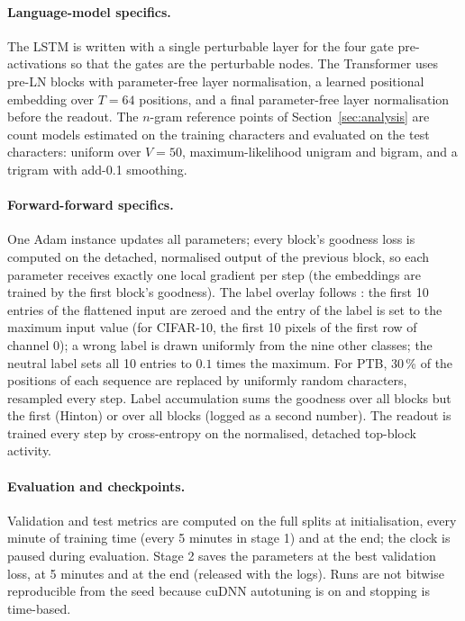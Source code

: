 \documentclass{article}
\begin{document}
\paragraph{Language-model specifics.}
The LSTM is written with a single perturbable layer for the four gate pre-activations
so that the gates are the perturbable nodes. The Transformer uses pre-LN blocks with
parameter-free layer normalisation, a learned positional embedding over $T=64$
positions, and a final parameter-free layer normalisation before the readout. The
$n$-gram reference points of Section~\ref{sec:analysis} are count models estimated on
the training characters and evaluated on the test characters: uniform over $V=50$,
maximum-likelihood unigram and bigram, and a trigram with add-0.1 smoothing.

\paragraph{Forward-forward specifics.}
One Adam instance updates all parameters; every block's goodness loss is computed on
the detached, normalised output of the previous block, so each parameter receives
exactly one local gradient per step (the embeddings are trained by the first block's
goodness). The label overlay follows \citet{pezeshki2023ff}: the first 10 entries of
the flattened input are zeroed and the entry of the label is set to the maximum input
value (for CIFAR-10, the first 10 pixels of the first row of channel 0); a wrong label
is drawn uniformly from the nine other classes; the neutral label sets all 10 entries
to $0.1$ times the maximum. For PTB, 30\,\% of the positions of each sequence are
replaced by uniformly random characters, resampled every step. Label accumulation sums
the goodness over all blocks but the first (Hinton) or over all blocks (logged as a
second number). The readout is trained every step by cross-entropy on the normalised,
detached top-block activity.

\paragraph{Evaluation and checkpoints.}
Validation and test metrics are computed on the full splits at initialisation, every
minute of training time (every 5 minutes in stage 1) and at the end; the clock is
paused during evaluation. Stage 2 saves the parameters at the best validation loss, at
5 minutes and at the end (released with the logs). Runs are not bitwise reproducible
from the seed because cuDNN autotuning is on and stopping is time-based.
\end{document}
